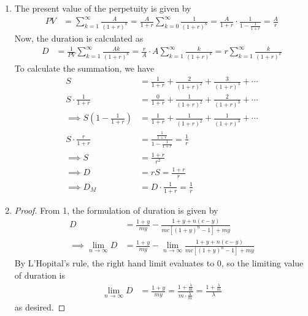 \documentclass{article}
\begin{document}
\begin{enumerate}[1.]
	\item 
		\begin{soln}
			The present value of the perpetuity is given by
			\begin{align*}
				PV &= \sum_{k=1}^{\infty} \frac{A}{(1+r)^k} = \frac{A}{1+r} \sum_{k=0}^{\infty} \frac{1}{(1+r)^k} = \frac{A}{1+r} \cdot \frac{1}{1-\frac{1}{1+r}} = \frac{A}{r}
			\end{align*}
			Now, the duration is calculated as
			\begin{align*}
				D &= \frac{1}{PV} \sum_{k=1}^{\infty} \frac{Ak}{(1+r)^k} = \frac{r}{A}\cdot A\sum_{k=1}^{\infty} \frac{k}{(1+r)^k} = r\sum_{k=1}^{\infty} \frac{k}{(1+r)^k}
			\end{align*}
			To calculate the summation, we have
			\begin{align*}
				S &= \frac{1}{1+r} + \frac{2}{(1+r)^2} + \frac{3}{(1+r)^3} + \cdots \\
				S\cdot \frac{1}{1+r} &= \frac{0}{1+r} + \frac{1}{(1+r)^2} + \frac{2}{(1+r)^3} + \cdots \\
				\implies S\left( 1-\frac{1}{1+r} \right) &= \frac{1}{1+r} + \frac{1}{(1+r)^2} + \frac{1}{(1+r)^3} + \cdots \\
				S\cdot \frac{r}{1+r} &= \frac{\frac{1}{1+r}}{1-\frac{1}{1+r}} = \frac{1}{r} \\
				\implies S &= \frac{1+r}{r^2} \\
				\implies D &= rS = \frac{1+r}{r} \\
				\implies D_M &= D\cdot \frac{1}{1+r} = \frac{1}{r}
			\end{align*}
		\end{soln}

	\item 
		\begin{proof}
			From 1, the formulation of duration is given by
			\begin{align*}
				D &= \frac{1+y}{my} - \frac{1+y+n(c-y)}{mc\left[ (1+y)^n-1 \right]+my} \\
				\implies \lim_{n\to\infty} D &= \frac{1+y}{my} - \lim_{n\to\infty} \frac{1+y+n(c-y)}{mc\left[ (1+y)^n-1 \right]+my}
			\end{align*}
			By L'Hopital's rule, the right hand limit evaluates to 0, so the limiting value of duration is
			\begin{align*}
				\lim_{n\to\infty} D &= \frac{1+y}{my} = \frac{1 + \frac{\lambda}{m}}{m\cdot \frac{\lambda}{m}} = \frac{1+\frac{\lambda}{m}}{\lambda}
			\end{align*}
			as desired.
		\end{proof}


\end{enumerate}
\end{document}
